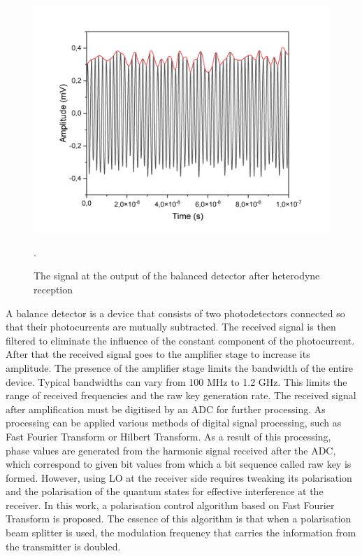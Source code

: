 \begin{figure}
    \centering
    \includegraphics[width=\textwidth]{images/balanced output heterodyne.png}
    \caption{The signal at the output of the balanced detector after heterodyne reception}.
    \label{fig:het time output syn}
\end{figure}
\newline A balance detector is a device that consists of two photodetectors connected so that their photocurrents are mutually subtracted. The received signal is then filtered to eliminate the influence of the constant component of the photocurrent. After that the received signal goes to the amplifier stage to increase its amplitude. The presence of the amplifier stage limits the bandwidth of the entire device. Typical bandwidths can vary from 100 MHz to 1.2 GHz. This limits the range of received frequencies and the raw key generation rate. 
\newline The received signal after amplification must be digitised by an ADC for further processing. As processing can be applied various methods of digital signal processing, such as Fast Fourier Transform or Hilbert Transform. As a result of this processing, phase values are generated from the harmonic signal received after the ADC, which correspond to given bit values from which a bit sequence called raw key is formed. 
However, using LO at the receiver side requires tweaking its polarisation and the polarisation of the quantum states for effective interference at the receiver. In this work, a polarisation control algorithm based on Fast Fourier Transform is proposed. The essence of this algorithm is that when a polarisation beam splitter is used, the modulation frequency that carries the information from the transmitter is doubled.
